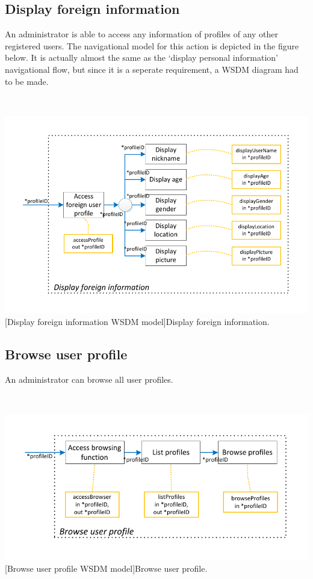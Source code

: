 \documentclass[11pt, a4paper,svglistings,oneside]{book}
\begin{document}
\clearpage

\subsection{Display foreign information}

An administrator is able to access any information of profiles of any other registered users. The navigational model for this action is depicted in the figure below. It is actually almost the same as the `display personal information' navigational flow, but since it is a seperate requirement, a WSDM diagram had to be made.

$\;$ \\
\noindent\begin{minipage}{\textwidth}
    \centering
   \includegraphics[scale=1]{Nav_DisplayForeignInformation.pdf}
 [Display foreign information WSDM model]{Display foreign information.}
\end{minipage}


\subsection{Browse user profile}

An administrator can browse all user profiles.

$\;$ \\
\noindent\begin{minipage}{\textwidth}
    \centering
   \includegraphics[scale=1]{nav_BrowsUserProfile2.pdf}
 [Browse user profile WSDM model]{Browse user profile.}
\end{minipage}
\end{document}
